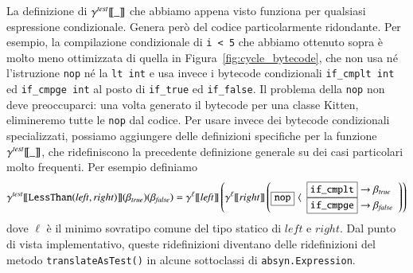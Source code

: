 La definizione di ${\gamma^{\mathit{test}}[\![{\_}]\!]}$ che abbiamo appena visto funziona per
qualsiasi espressione condizionale. Genera per\`o del codice
particolarmente ridondante. Per esempio, la compilazione condizionale
di \texttt{i < 5} che abbiamo ottenuto sopra \`e molto meno ottimizzata
di quella in Figura~\ref{fig:cycle_bytecode}, che non usa n\'e l'istruzione
\texttt{nop} n\'e la \texttt{lt int} e usa invece i bytecode condizionali
\texttt{if\_cmplt int} ed \texttt{if\_cmpge int} al posto di
\texttt{if\_true} ed \texttt{if\_false}. Il problema della \texttt{nop}
non deve preoccuparci: una volta
generato il bytecode per una classe Kitten, elimineremo
tutte le \texttt{nop} dal codice. Per usare invece dei bytecode condizionali
specializzati, possiamo aggiungere delle definizioni specifiche
per la funzione ${\gamma^{\mathit{test}}[\![{\_}]\!]}$, che ridefiniscono la precedente definizione
generale su dei casi particolari molto frequenti. Per esempio definiamo
%
\[
  {\gamma^{\mathit{test}}[\![{\mathtt{LessThan(\mathit{left},\mathit{right})}}]\!]}
    (\beta_\mathit{true})(\beta_\mathit{false})
    ={\gamma^{{\ell}}[\![{\mathit{left}}]\!]}\left({\gamma^{{\ell}}[\![{\mathit{right}}]\!]}\left(
    \fbox{$\mathtt{nop}$}\,\,\langle
    \begin{array}{l}
        \fbox{$\mathtt{if\_cmplt}$}\to\beta_{\mathit{true}}\\
        \fbox{$\mathtt{if\_cmpge}$}\to\beta_\mathit{false}
    \end{array}
  \right)\right)
\]
%
dove $\ell$ \`e il minimo sovratipo comune del tipo statico di
$\mathit{left}$ e $\mathit{right}$. Dal punto di vista implementativo,
queste ridefinizioni diventano delle ridefinizioni del metodo
\texttt{translateAsTest()} in alcune sottoclassi di
\texttt{absyn.Expression}.
%
